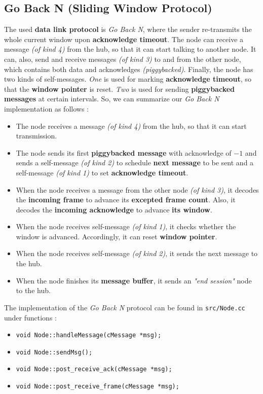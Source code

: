 \subsection{Go Back N (Sliding Window Protocol)}
The used \textbf{data link protocol} is \emph{Go Back N}, where the sender re-transmits the whole current window upon \textbf{acknowledge timeout}. The node can receive a message \emph{(of kind 4)} from the hub, so that it can start talking to another node. It can, also, send and receive messages \emph{(of kind 3)} to and from the other node, which contains both data and acknowledges \emph{(piggybacked)}. Finally, the node has two kinds of self-messages. \emph{One} is used for marking \textbf{acknowledge timeout}, so that the \textbf{window pointer} is reset. \emph{Two} is used for sending \textbf{piggybacked messages} at certain intervals. So, we can summarize our \emph{Go Back N} implementation as follows :
\begin{itemize}
    \item The node receives a message \emph{(of kind 4)} from the hub, so that it can start transmission.
    \item The node sends its first \textbf{piggybacked message} with acknowledge of $-1$ and sends a self-message \emph{(of kind 2)} to schedule \textbf{next message} to be sent and a self-message \emph{(of kind 1)} to set \textbf{acknowledge timeout}.
    \item When the node receives a message from the other node \emph{(of kind 3)}, it decodes the \textbf{incoming frame} to advance its \textbf{excepted frame count}. Also, it decodes the \textbf{incoming acknowledge} to advance \textbf{its window}.
    \item When the node receives self-message \emph{(of kind 1)}, it checks whether the window is advanced. Accordingly, it can reset \textbf{window pointer}.
    \item When the node receives self-message \emph{(of kind 2)}, it sends the next message to the hub.
    \item When the node finishes its \textbf{message buffer}, it sends an \textit{"end session"} node to the hub.
\end{itemize}

The implementation of the \emph{Go Back N} protocol can be found in \texttt{src/Node.cc} under functions :
\begin{itemize}
    \item \texttt{void Node::handleMessage(cMessage *msg);}
    \item \texttt{void Node::sendMsg();}
    \item \texttt{void Node::post\_receive\_ack(cMessage *msg);}
    \item \texttt{void Node::post\_receive\_frame(cMessage *msg);}
\end{itemize}

